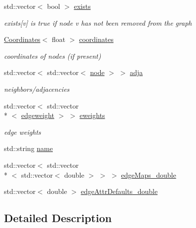 \begin{DoxyCompactItemize}
std\-::vector$<$ bool $>$ \hyperlink{class_networ_kit_1_1_graph_a3e97dc6389c8e8c80e8a561a55657c71}{exists}
\begin{DoxyCompactList}\small\item\em exists\mbox{[}v\mbox{]} is true if node v has not been removed from the graph \end{DoxyCompactList}\item 
\hyperlink{class_networ_kit_1_1_graph_1_1_coordinates}{Coordinates}$<$ float $>$ \hyperlink{class_networ_kit_1_1_graph_adf7947ed51f224eaeae0c07a8aaedeae}{coordinates}
\begin{DoxyCompactList}\small\item\em coordinates of nodes (if present) \end{DoxyCompactList}\item 
std\-::vector$<$ std\-::vector$<$ \hyperlink{namespace_networ_kit_a53fe3e4fd04ea024160e4d024dfebadf}{node} $>$ $>$ \hyperlink{class_networ_kit_1_1_graph_ad731885a6d7d7cf22ec8a8babc77d389}{adja}
\begin{DoxyCompactList}\small\item\em neighbors/adjacencies \end{DoxyCompactList}\item 
std\-::vector$<$ std\-::vector\\*
$<$ \hyperlink{namespace_networ_kit_a831b108dbcd79dad062d9e28b1b4e3dd}{edgeweight} $>$ $>$ \hyperlink{class_networ_kit_1_1_graph_a6fb34025f32ff2850911ee0e90b085fa}{eweights}
\begin{DoxyCompactList}\small\item\em edge weights \end{DoxyCompactList}\item 
std\-::string \hyperlink{class_networ_kit_1_1_graph_aad1c9901bb8b7493df628469be54300a}{name}
\item 
std\-::vector$<$ std\-::vector\\*
$<$ std\-::vector$<$ double $>$ $>$ $>$ \hyperlink{class_networ_kit_1_1_graph_a63a00d1d3330ce8050fcd77794ec8d45}{edge\-Maps\-\_\-double}
\item 
std\-::vector$<$ double $>$ \hyperlink{class_networ_kit_1_1_graph_ac3f25277b53638e1486cde303803eb0a}{edge\-Attr\-Defaults\-\_\-double}
\end{DoxyCompactItemize}


\subsection{Detailed Description}


